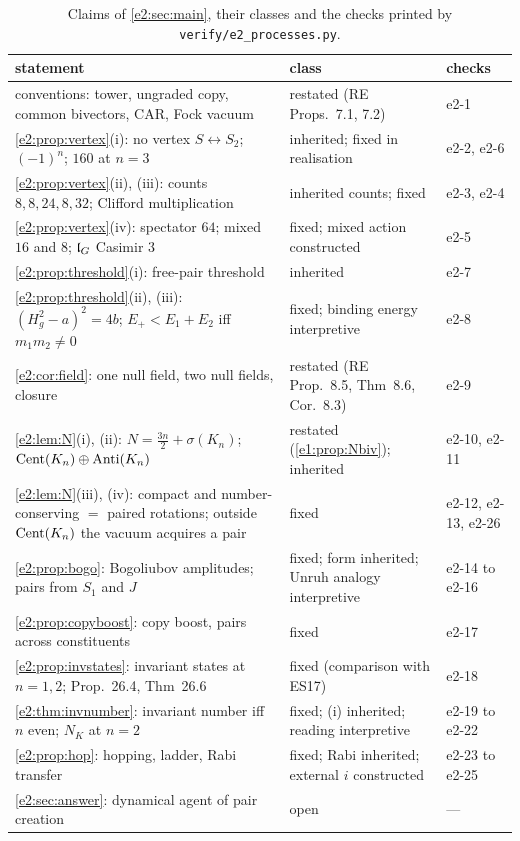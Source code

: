 \begin{table}[!htbp]
\centering
\footnotesize
\begin{tabular}{@{}>{\raggedright\arraybackslash}p{8.3cm}>{\raggedright\arraybackslash}p{4.4cm}>{\raggedright\arraybackslash}p{2.2cm}@{}}
\toprule
statement & class & checks\\
\midrule
conventions: tower, ungraded copy, common bivectors, CAR, Fock vacuum & restated (RE Props.~7.1, 7.2) & e2-1\\
\cref{e2:prop:vertex}(i): no vertex $S\leftrightarrow S_2$; $(-1)^n$; $160$ at $n=3$ & inherited; fixed in realisation & e2-2, e2-6\\
\cref{e2:prop:vertex}(ii), (iii): counts $8,8,24,8,32$; Clifford multiplication & inherited counts; fixed & e2-3, e2-4\\
\cref{e2:prop:vertex}(iv): spectator $64$; mixed $16$ and $8$; $\mathfrak l_G$ Casimir $3$ & fixed; mixed action constructed & e2-5\\
\cref{e2:prop:threshold}(i): free-pair threshold & inherited & e2-7\\
\cref{e2:prop:threshold}(ii), (iii): $(H_g^2-a)^2=4b$; $E_+<E_1+E_2$ iff $m_1m_2\neq0$ & fixed; binding energy interpretive & e2-8\\
\cref{e2:cor:field}: one null field, two null fields, closure & restated (RE Prop.~8.5, Thm~8.6, Cor.~8.3) & e2-9\\
\cref{e2:lem:N}(i), (ii): $N=\tfrac{3n}2+\sigma(K_n)$; $\operatorname{Cent}(K_n)\oplus\mathrm{Anti}(K_n)$ & restated (\cref{e1:prop:Nbiv}); inherited & e2-10, e2-11\\
\cref{e2:lem:N}(iii), (iv): compact and number-conserving $=$ paired rotations; outside $\operatorname{Cent}(K_n)$ the vacuum acquires a pair & fixed & e2-12, e2-13, e2-26\\
\cref{e2:prop:bogo}: Bogoliubov amplitudes; pairs from $S_1$ and $J$ & fixed; form inherited; Unruh analogy interpretive & e2-14 to e2-16\\
\cref{e2:prop:copyboost}: copy boost, pairs across constituents & fixed & e2-17\\
\cref{e2:prop:invstates}: invariant states at $n=1,2$; Prop.~26.4, Thm~26.6 & fixed (comparison with ES17) & e2-18\\
\cref{e2:thm:invnumber}: invariant number iff $n$ even; $N_K$ at $n=2$ & fixed; (i) inherited; reading interpretive & e2-19 to e2-22\\
\cref{e2:prop:hop}: hopping, ladder, Rabi transfer & fixed; Rabi inherited; external $i$ constructed & e2-23 to e2-25\\
\cref{e2:sec:answer}: dynamical agent of pair creation & open & ---\\
\bottomrule
\end{tabular}
\caption{Claims of \cref{e2:sec:main}, their classes and the checks printed by \texttt{verify/e2\_processes.py}.}
\label{e2:tab:claims}
\end{table}

